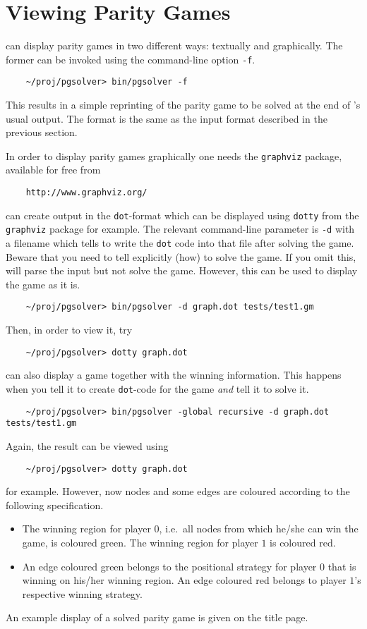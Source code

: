 \section{Viewing Parity Games}
\label{sec:viewing}

\pgsolver can display parity games in two different ways: textually and graphically. The former
can be invoked using the command-line option \texttt{-f}.
\begin{verbatim}
    ~/proj/pgsolver> bin/pgsolver -f 
\end{verbatim}
This results in a simple reprinting of the parity game to be solved at the end of \pgsolver's usual
output. The format is the same as the input format described in the previous section.

In order to display parity games graphically one needs the \texttt{graphviz} package, available for
free from
\begin{verbatim}
    http://www.graphviz.org/
\end{verbatim}
\pgsolver can create output in the \texttt{dot}-format which can be displayed using \texttt{dotty} from
the \texttt{graphviz} package for example. The relevant command-line parameter is \texttt{-d} with
a filename which tells \pgsolver to write the \texttt{dot} code into that file after solving the game.
Beware that you need to tell \pgsolver explicitly (how) to solve the game. If you omit this, \pgsolver
will parse the input but not solve the game. However, this can be used to display the game as it is.
\begin{verbatim}
    ~/proj/pgsolver> bin/pgsolver -d graph.dot tests/test1.gm
\end{verbatim}
Then, in order to view it, try
\begin{verbatim}
    ~/proj/pgsolver> dotty graph.dot
\end{verbatim}
\pgsolver can also display a game together with the winning information. This happens when you tell it
to create \texttt{dot}-code for the game \emph{and} tell it to solve it.
\begin{verbatim}
    ~/proj/pgsolver> bin/pgsolver -global recursive -d graph.dot tests/test1.gm
\end{verbatim}
Again, the result can be viewed using
\begin{verbatim}
    ~/proj/pgsolver> dotty graph.dot
\end{verbatim}
for example. However, now nodes and some edges are coloured according to the following specification.
\begin{itemize}
\item The winning region for player $0$, i.e.\ all nodes from which he/she can win the game, is coloured 
      green. The winning region for player $1$ is coloured red.
\item An edge coloured green belongs to the positional strategy for player $0$ that is winning on his/her
      winning region. An edge coloured red belongs to player $1$'s respective winning strategy.
\end{itemize}
An example display of a solved parity game is given on the title page.



